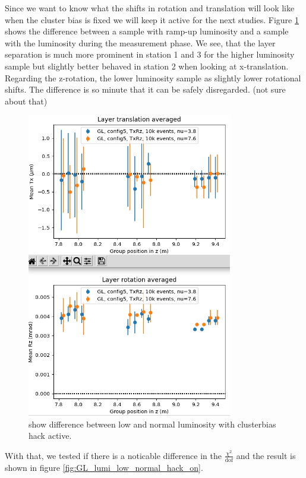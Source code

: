 Since we want to know what the shifts in rotation and translation will look like when the cluster bias is fixed we will keep it active for the next studies.
Figure \ref{fig:lumi_low_normal_hack_on} shows the difference between a sample with ramp-up luminosity and a sample with the luminosity during the measurement phase.
We see, that the layer separation is much more prominent in station 1 and 3 for the higher luminosity sample but slightly better behaved in station 2 when looking at x-translation.
Regarding the z-rotation, the lower luminosity sample as slightly lower rotational shifts.
The difference is so minute that it can be safely disregarded. (not sure about that)

\begin{figure}
  \centering
  \includegraphics[width=0.8\textwidth]{plots/jan_24_2022/low_normal_with_hack.png}
  \caption{show difference between low and normal luminosity with clusterbias hack active.}
  \label{fig:lumi_low_normal_hack_on}
\end{figure}

With that, we tested if there is a noticable difference in the $\frac{\chi^2}{\text{dof}}$
and the result is shown in figure \ref{fig:GL_lumi_low_normal_hack_on}.

